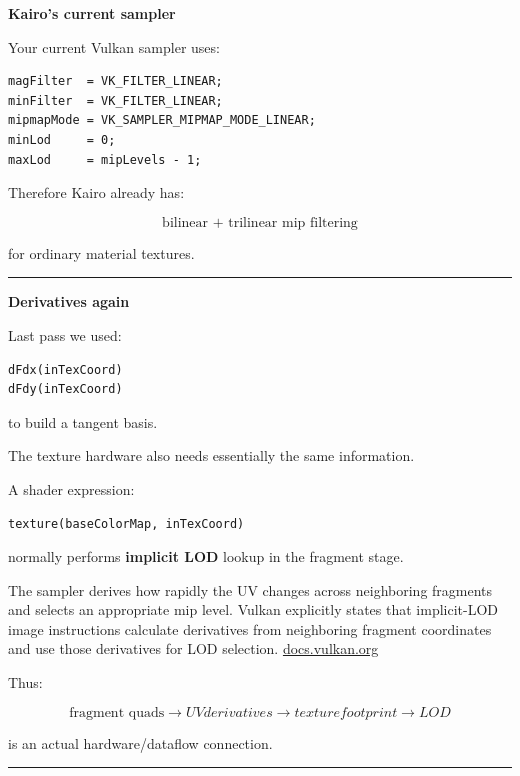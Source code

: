 \textbf{Kairo's current sampler}

Your current Vulkan sampler uses:

\begin{verbatim}
magFilter  = VK_FILTER_LINEAR;
minFilter  = VK_FILTER_LINEAR;
mipmapMode = VK_SAMPLER_MIPMAP_MODE_LINEAR;
minLod     = 0;
maxLod     = mipLevels - 1;
\end{verbatim}

Therefore Kairo already has:

\[
\boxed{\text{bilinear + trilinear mip filtering}}
\]

for ordinary material textures.

\begin{center}\rule{0.5\linewidth}{0.5pt}\end{center}

\textbf{Derivatives again}

Last pass we used:

\begin{verbatim}
dFdx(inTexCoord)
dFdy(inTexCoord)
\end{verbatim}

to build a tangent basis.

The texture hardware also needs essentially the same information.

A shader expression:

\begin{verbatim}
texture(baseColorMap, inTexCoord)
\end{verbatim}

normally performs \textbf{implicit LOD} lookup in the fragment stage.

The sampler derives how rapidly the UV changes across neighboring fragments and selects an appropriate mip level. Vulkan explicitly states that implicit-LOD image instructions calculate derivatives from neighboring fragment coordinates and use those derivatives for LOD selection. \href{https://docs.vulkan.org/spec/latest/chapters/textures.html?utm_source=chatgpt.com}{docs.vulkan.org}

Thus:

\[
\boxed{
\text{fragment quads}
\rightarrow
UV derivatives
\rightarrow
texture footprint
\rightarrow
LOD
}
\]

is an actual hardware/dataflow connection.

\begin{center}\rule{0.5\linewidth}{0.5pt}\end{center}

